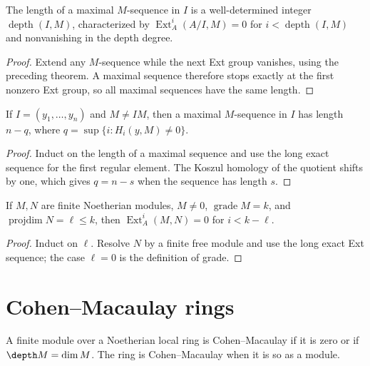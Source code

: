 \begin{theorem}[Depth]\label{mcrt-thm-16-7}
The length of a maximal $M$-sequence in $I$ is a well-determined integer
$\operatorname{depth}(I,M)$, characterized by
$\operatorname{Ext}^i_A(A/I,M)=0$ for $i<\operatorname{depth}(I,M)$ and
nonvanishing in the depth degree.
\end{theorem}
\begin{proof}
Extend any $M$-sequence while the next Ext group vanishes, using the preceding
theorem.  A maximal sequence therefore stops exactly at the first nonzero Ext
group, so all maximal sequences have the same length.
\end{proof}

\begin{theorem}\label{mcrt-thm-16-8}
If $I=(y_1,\ldots,y_n)$ and $M\ne IM$, then a maximal $M$-sequence in $I$
has length $n-q$, where $q=\sup\{i:H_i(y,M)\ne0\}$.
\end{theorem}
\begin{proof}
Induct on the length of a maximal sequence and use the long exact sequence for
the first regular element.  The Koszul homology of the quotient shifts by one,
which gives $q=n-s$ when the sequence has length $s$.
\end{proof}

\begin{theorem}\label{mcrt-thm-16-9}
If $M,N$ are finite Noetherian modules, $M\ne0$, $\operatorname{grade}M=k$,
and $\operatorname{projdim}N=\ell\le k$, then
$\operatorname{Ext}^i_A(M,N)=0$ for $i<k-\ell$.
\end{theorem}
\begin{proof}
Induct on $\ell$.  Resolve $N$ by a finite free module and use the long exact
Ext sequence; the case $\ell=0$ is the definition of grade.
\end{proof}

\section{Cohen--Macaulay rings}
\begin{definition}\label{mcrt-def-cm}\uses{}
A finite module over a Noetherian local ring is Cohen--Macaulay if it is zero or
if $\depth M=\dim M$.  The ring is Cohen--Macaulay when it is so as a module.
\end{definition}

